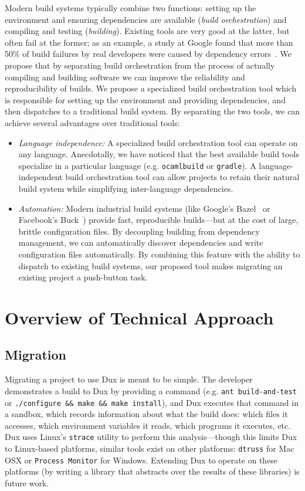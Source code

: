 \documentclass[10pt,conference]{IEEEtran}
\begin{document}
                Modern build systems typically combine two functions:
setting up the environment and ensuring dependencies are available (\textit{build orchestration})
and compiling and testing (\textit{building}).
Existing tools are very good at the latter, but often fail at the former;
as an example, a study at Google found that more than 50\% of build failures
by real developers were caused by dependency errors~\cite{googlebuilderrors}.
We propose that by separating build orchestration from the process of actually
compiling and building software we can improve the reliability and reproducibility of builds.
We propose a specialized build orchestration tool which is responsible for setting up the environment
and providing dependencies, and then dispatches to a traditional build system.
By separating the two tools, we can achieve several advantages over traditional tools:
\begin{itemize}
\item{
\textit{Language independence:}
A specialized build orchestration tool can operate on any language.
Anecdotally, we have noticed that the best available build tools specialize
in a particular language (e.g. \texttt{ocamlbuild} or \texttt{gradle}).
A language-independent build orchestration tool can allow projects to retain
their natural build system while simplifying inter-language dependencies.
}
\item{
\textit{Automation:}
Modern industrial build systems (like Google's Bazel~\cite{blaze} or Facebook's Buck~\cite{buck}) provide fast,
reproducible builds---but at the cost of large, brittle configuration files.
By decoupling building from dependency management, we can automatically
discover dependencies and write configuration files automatically.
By combining this feature with the ability to dispatch to existing build systems,
our proposed tool makes migrating an existing project a push-button task.
}
\end{itemize}

\section{Overview of Technical Approach}

\subsection{Migration}

Migrating a project to use Dux is meant to be simple.
The developer demonstrates a build to Dux by providing a command (e.g. \texttt{ant build-and-test}
or \texttt{./configure \&\& make \&\& make install}),
and Dux executes that command in a sandbox, which records information about what the build does:
which files it accesses, which environment variables it reads, which programs it executes, etc.
Dux uses Linux's \texttt{strace} utility to perform this analysis---though this limits Dux to
Linux-based platforms, similar tools exist on other platforms: \texttt{dtruss} for Mac OSX or
\texttt{Process Monitor} for Windows. Extending Dux to operate on these platforms (by writing a
library that abstracts over the results of these libraries) is future work.
\end{document}
